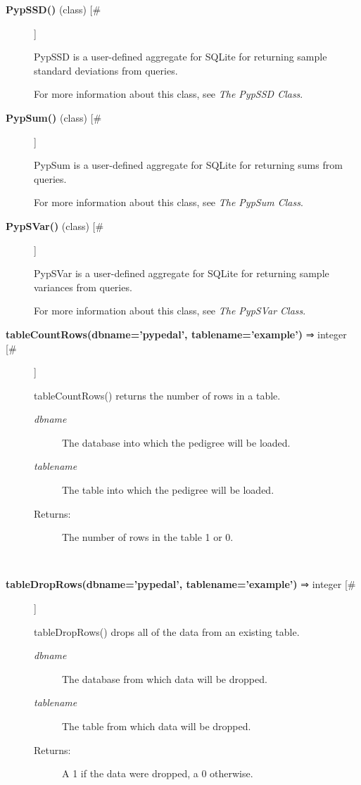 \begin{description}
\item[\textbf{PypSSD()} (class) [\#]
]
\par PypSSD is a user-defined aggregate for SQLite for returning sample standard deviations
from queries.
\par For more information about this class, see \textit{The PypSSD Class}.

\item[\textbf{PypSum()} (class) [\#]
]
\par PypSum is a user-defined aggregate for SQLite for returning sums from queries.
\par For more information about this class, see \textit{The PypSum Class}.

\item[\textbf{PypSVar()} (class) [\#]
]
\par PypSVar is a user-defined aggregate for SQLite for returning sample variances
from queries.
\par For more information about this class, see \textit{The PypSVar Class}.

\item[\textbf{tableCountRows(dbname='pypedal', tablename='example')} ⇒ integer [\#]
]
\par tableCountRows() returns the number of rows in a table.
\begin{description}
\item[\textit{dbname}
]
The database into which the pedigree will be loaded.
\item[\textit{tablename}
]
The table into which the pedigree will be loaded.
\item[Returns:
]
The number of rows in the table 1 or 0.
\end{description}\\

\item[\textbf{tableDropRows(dbname='pypedal', tablename='example')} ⇒ integer [\#]
]
\par tableDropRows() drops all of the data from an existing table.
\begin{description}
\item[\textit{dbname}
]
The database from which data will be dropped.
\item[\textit{tablename}
]
The table from which data will be dropped.
\item[Returns:
]
A 1 if the data were dropped, a 0 otherwise.
\end{description}\\


\end{description}
